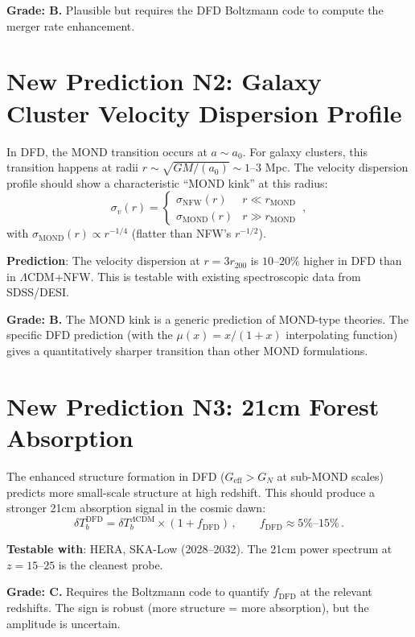\documentclass[11pt,a4paper]{article}
\begin{document}
\textbf{Grade: B.} Plausible but requires the DFD Boltzmann code to compute the merger rate enhancement.

\section{New Prediction N2: Galaxy Cluster Velocity Dispersion Profile}

In DFD, the MOND transition occurs at $a \sim a_0$. For galaxy clusters, this transition happens at radii $r \sim \sqrt{GM/(a_0)} \sim 1$--$3$ Mpc. The velocity dispersion profile should show a characteristic ``MOND kink'' at this radius:
\begin{equation}
\sigma_v(r) = \begin{cases} \sigma_{\mathrm{NFW}}(r) & r \ll r_{\mathrm{MOND}} \\ \sigma_{\mathrm{MOND}}(r) & r \gg r_{\mathrm{MOND}} \end{cases}\,,
\end{equation}
with $\sigma_{\mathrm{MOND}}(r) \propto r^{-1/4}$ (flatter than NFW's $r^{-1/2}$).

\textbf{Prediction}: The velocity dispersion at $r = 3r_{200}$ is $10$--$20\%$ higher in DFD than in $\Lambda$CDM+NFW. This is testable with existing spectroscopic data from SDSS/DESI.

\textbf{Grade: B.} The MOND kink is a generic prediction of MOND-type theories. The specific DFD prediction (with the $\mu(x) = x/(1+x)$ interpolating function) gives a quantitatively sharper transition than other MOND formulations.

\section{New Prediction N3: 21cm Forest Absorption}

The enhanced structure formation in DFD ($G_{\mathrm{eff}} > G_N$ at sub-MOND scales) predicts more small-scale structure at high redshift. This should produce a stronger 21cm absorption signal in the cosmic dawn:
\begin{equation}
\delta T_b^{\mathrm{DFD}} = \delta T_b^{\Lambda\mathrm{CDM}} \times (1 + f_{\mathrm{DFD}})\,,\qquad f_{\mathrm{DFD}} \approx 5\%\text{--}15\%\,.
\end{equation}

\textbf{Testable with}: HERA, SKA-Low (2028--2032). The 21cm power spectrum at $z = 15$--$25$ is the cleanest probe.

\textbf{Grade: C.} Requires the Boltzmann code to quantify $f_{\mathrm{DFD}}$ at the relevant redshifts. The sign is robust (more structure = more absorption), but the amplitude is uncertain.
\end{document}
